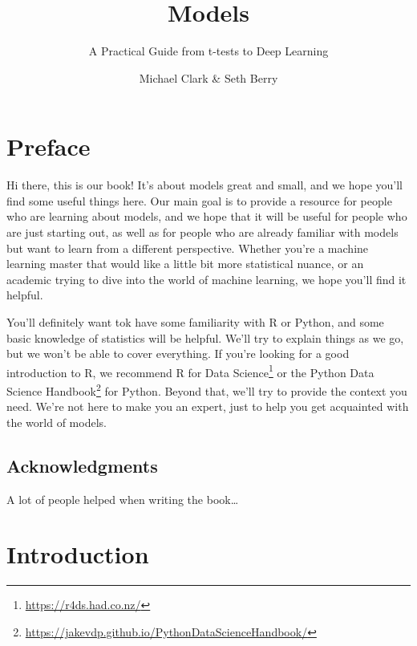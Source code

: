 \documentclass[
  letterpaper,
]{krantz}
\title{Models}
\subtitle{A Practical Guide from t-tests to Deep Learning}
\author{Michael Clark \& Seth Berry}
\date{}
\renewcommand*\contentsname{Table of contents}
\newcommand\contentsname{Table of contents}
\DeclareRobustCommand{\href}[2]{#2\footnote{\url{#1}}}
\begin{document}
\maketitle
\renewcommand*\contentsname{Contents}
{
\hypersetup{linkcolor=}
\setcounter{tocdepth}{2}
\tableofcontents
}

\chapter*{Preface}\label{preface}


Hi there, this is our book! It's about models great and small, and we
hope you'll find some useful things here. Our main goal is to provide a
resource for people who are learning about models, and we hope that it
will be useful for people who are just starting out, as well as for
people who are already familiar with models but want to learn from a
different perspective. Whether you're a machine learning master that
would like a little bit more statistical nuance, or an academic trying
to dive into the world of machine learning, we hope you'll find it
helpful.

You'll definitely want tok have some familiarity with R or Python, and
some basic knowledge of statistics will be helpful. We'll try to explain
things as we go, but we won't be able to cover everything. If you're
looking for a good introduction to R, we recommend
\href{https://r4ds.had.co.nz/}{R for Data Science} or the
\href{https://jakevdp.github.io/PythonDataScienceHandbook/}{Python Data
Science Handbook} for Python. Beyond that, we'll try to provide the
context you need. We're not here to make you an expert, just to help you
get acquainted with the world of models.

\section*{Acknowledgments}\label{acknowledgments}


A lot of people helped when writing the book\ldots{}


\chapter{Introduction}\label{introduction}
\end{document}
